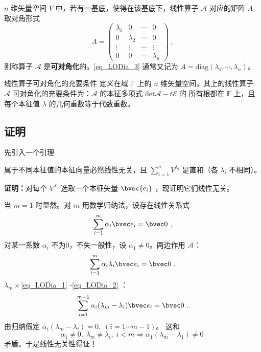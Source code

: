 \begin{definition}{}
 $n$ 维矢量空间 $V$ 中，若有一基底，使得在该基底下，线性算子 $\mathcal{A}$ 对应的矩阵 $A$ 取对角形式
 \begin{equation}\label{eq_LODia_3}
 A=\begin{pmatrix}
 \lambda_1&0&\cdots&0\\
 0&\lambda_2&\cdots&0\\
 \vdots&\vdots&\cdots&\vdots\\
 0&0&\cdots&\lambda_n
 \end{pmatrix}~,
 \end{equation}
 则称算子 $\mathcal{A}$ 是\textbf{可对角化}的。\autoref{eq_LODia_3} 通常又记为 $A=\mathrm{diag}(\lambda_1,\cdots,\lambda_n)$。
\end{definition}
\begin{theorem}{线性算子可对角化的充要条件}\label{the_LODia_1}
定义在域 $\mathbb{F}$ 上的 $n$ 维矢量空间，其上的线性算子 $\mathcal{A}$ 可对角化的充要条件为：$\mathcal{A}$ 的本征多项式 $\mathrm{det}{\mathcal{A}-t \mathcal{E}}$ 的 所有根都在 $\mathbb{F}$ 上，且每个本征值 $\lambda$ 的几何重数等于代数重数。
\end{theorem}
\subsection{证明}
先引入一个引理
\begin{lemma}{}\label{lem_LODia_1}
属于不同本征值的本征向量必然线性无关，且 $\sum\limits_{i=1}^nV^{\lambda_i}$ 是直和（各 $\lambda_i$ 不相同）。
\end{lemma}
\textbf{证明：}对每个 $V^{\lambda_i}$ 选取一个本征矢量 $\bvec{e_i}$ ，现证明它们线性无关。

当 $m=1$ 时显然。对 $m$ 用数学归纳法，设存在线性关系式
\begin{equation}\label{eq_LODia_1}
\sum_{i=1}^{m}\alpha_i\bvec e_i=\bvec 0~,
\end{equation}
对某一系数 $\alpha_i$ 不为0，不失一般性，设 $\alpha_1\neq0$。两边作用 $\mathcal A$：
\begin{equation}\label{eq_LODia_2}
\sum_{i=1}^m\alpha_i\lambda_i\bvec e_i=\bvec 0~.
\end{equation}
$\lambda_m\times$\autoref{eq_LODia_1} -\autoref{eq_LODia_2} ：
\begin{equation}
\sum_{i=1}^{m-1}\alpha_i(\lambda_m-\lambda_i)\bvec e_i=\bvec 0~.
\end{equation}
由归纳假定 $\alpha_i(\lambda_m-\lambda_i)=0,\;(i=1\cdots m-1)$。 这和
\begin{equation}
\alpha_1\ne0,\;\lambda_m\neq\lambda_i,\;i<m\Rightarrow \alpha_1(\lambda
_m-\lambda_1)\neq0~
\end{equation}
矛盾。于是线性无关性得证！

